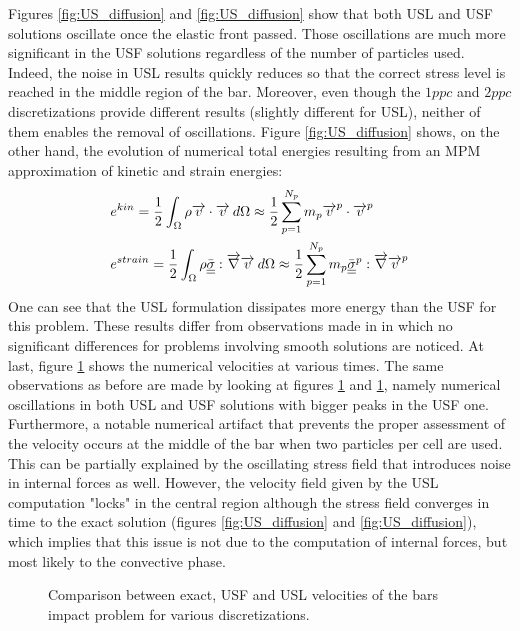 Figures \ref{fig:US_diffusion} and \ref{fig:US_diffusion} show that both USL and USF solutions oscillate once the elastic front passed.
Those oscillations are much more significant in the USF solutions regardless of the number of particles used.
Indeed, the noise in USL results quickly reduces so that the correct stress level is reached in the middle region of the bar.
Moreover, even though the $1ppc$ and $2ppc$ discretizations provide different results (slightly different for USL), neither of them enables the removal of oscillations.
Figure \ref{fig:US_diffusion} shows, on the other hand, the evolution of numerical total energies resulting from an MPM approximation of kinetic and strain energies:
\begin{align}
  & e^{kin}=\frac{1}{2}\int_\Omega \rho {\overrightarrow{v}}\cdot{\overrightarrow{v}} \:d\Omega \approx \frac{1}{2}\sum_{p=1}^{N_p} m_p {\overrightarrow{v}}^p\cdot{\overrightarrow{v}}^p\\
& e^{strain}= \frac{1}{2}\int_\Omega \rho {\underline{\underline{\bar{\sigma}}}}: {\overrightarrow{\nabla}} {\overrightarrow{v}} \:d\Omega \approx \frac{1}{2}\sum_{p=1}^{N_p} m_p {\underline{\underline{\bar{\sigma}}}}^p: {\overrightarrow{\nabla}} {\overrightarrow{v}}^p
\end{align}
One can see that the USL formulation dissipates more energy than the USF for this problem.
These results differ from observations made in \cite{Bardenhagen_USF_USL} in which no significant differences for problems involving smooth solutions are noticed.
At last, figure \ref{fig:US_velocities} shows the numerical velocities at various times.
The same observations as before are made by looking at figures \ref{fig:US_velocities} and \ref{fig:US_velocities}, namely numerical oscillations in both USL and USF solutions with bigger peaks in the USF one.
Furthermore, a notable numerical artifact that prevents the proper assessment of the velocity occurs at the middle of the bar when two particles per cell are used.
This can be partially explained by the oscillating stress field that introduces noise in internal forces as well.
However, the velocity field given by the USL computation "locks" in the central region although the stress field converges in time to the exact solution (figures \ref{fig:US_diffusion} and \ref{fig:US_diffusion}), which implies that this issue is not due to the computation of internal forces, but most likely to the convective phase.
\begin{figure}[ht]
  \centering
  { \label{subfig:US_velo_10}}
  { \label{subfig:US_velo_25}}
  \caption{Comparison between exact, USF and USL velocities of the bars impact problem for various discretizations.}
  \label{fig:US_velocities}
\end{figure}

